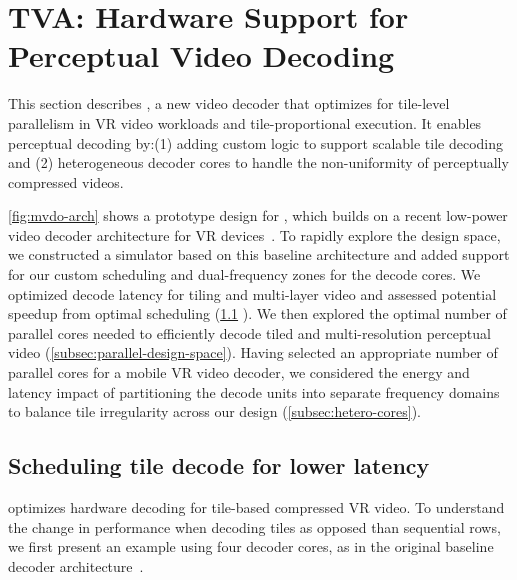 
\section{TVA: Hardware Support for Perceptual Video Decoding}
\label{sec:vdo-hw}

This section describes \nameArch, a new video decoder that optimizes for tile-level parallelism in VR video workloads and tile-proportional execution.
It enables perceptual decoding by:(1) adding custom logic to support scalable tile decoding and (2) heterogeneous decoder cores to handle the non-uniformity of perceptually compressed videos.

\vdoOverview

\ref{fig:mvdo-arch} shows a prototype design for \nameArch, which builds on a recent low-power video decoder architecture for VR devices~\cite{tikekar18ijssc}.
To rapidly explore the design space, we constructed a simulator based on this baseline architecture and added support for our custom scheduling and dual-frequency zones for the decode cores.
We optimized decode latency for tiling and multi-layer video and assessed potential speedup from optimal scheduling (\ref{subsec:tile-sched} ).
We then explored the optimal number of parallel cores needed to efficiently decode tiled and multi-resolution perceptual video (\ref{subsec:parallel-design-space}).
Having selected an appropriate number of parallel cores for a mobile VR video decoder, we considered the energy and latency impact of partitioning the decode units into separate frequency domains to balance tile irregularity across our design (\ref{subsec:hetero-cores}).

\subsection{Scheduling tile decode for lower latency}
\label{subsec:tile-sched}
\nameArch optimizes hardware decoding for tile-based compressed VR video.
To understand the change in performance when decoding tiles as opposed than sequential rows, we first present an example using four decoder cores, as in the original baseline decoder architecture~\cite{hevcThesis}.


\vdecCTUTimingFigure

